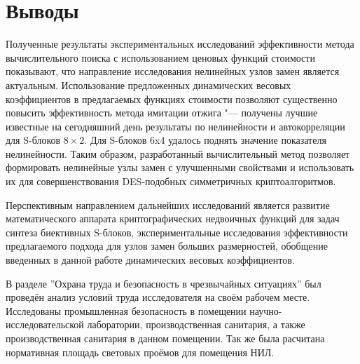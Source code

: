 \chapter*{Выводы}

Полученные результаты экспериментальных исследований эффективности метода
вычислительного поиска с использованием ценовых функций стоимости показывают,
что направление исследования нелинейных узлов замен является актуальным.
Использование предложенных динамических весовых коэффициентов в предлагаемых
функциях стоимости позволяют существенно повысить эффективность метода имитации
отжига "--- получены лучшие известные на сегодняшний день результаты по
нелинейности и автокорреляции для S-блоков $8 \times 2$. Для S-блоков 6x4
удалось поднять значение показателя нелинейности.  Таким образом, разработанный
вычислительный метод позволяет формировать нелинейные узлы замен с улучшенными
свойствами и использовать их для совершенствования DES-подобных симметричных
криптоалгоритмов.

Перспективным направлением дальнейших исследований является развитие
математического аппарата криптографических недвоичных функций для задач синтеза
биективных S-блоков, экспериментальные исследования эффективности предлагаемого
подхода для узлов замен больших размерностей, обобщение введенных в данной
работе динамических весовых коэффициентов.

В разделе ''Охрана труда и безопасность в чрезвычайных ситуациях'' был проведён
анализ условий труда исследователя на своём рабочем месте. Исследованы
промышленная безопасность в помещении научно-исследовательской лаборатории,
производственная санитария, а также производственная санитария в данном
помещении. Так же была расчитана нормативная площадь световых проёмов для
помещения НИЛ.
